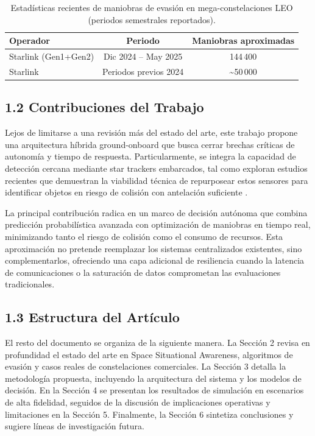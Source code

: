 \begin{table}[t]
\centering
\caption{Estadísticas recientes de maniobras de evasión en mega-constelaciones LEO (periodos semestrales reportados).}
\label{tab:maniobras_evasion}
\begin{tabular}{lcc}
\toprule
Operador & Periodo & Maniobras aproximadas \\
\midrule
Starlink (Gen1+Gen2) & Dic 2024 -- May 2025 & 144\,400 \\
Starlink & Periodos previos 2024 & \textasciitilde50\,000 \\
\bottomrule
\end{tabular}
\end{table}

\subsection{1.2 Contribuciones del Trabajo}

Lejos de limitarse a una revisión más del estado del arte, este trabajo propone una arquitectura híbrida ground-onboard que busca cerrar brechas críticas de autonomía y tiempo de respuesta. Particularmente, se integra la capacidad de detección cercana mediante star trackers embarcados, tal como exploran estudios recientes que demuestran la viabilidad técnica de repurposear estos sensores para identificar objetos en riesgo de colisión con antelación suficiente \cite{campiti2025detectability}.

La principal contribución radica en un marco de decisión autónoma que combina predicción probabilística avanzada con optimización de maniobras en tiempo real, minimizando tanto el riesgo de colisión como el consumo de recursos. Esta aproximación no pretende reemplazar los sistemas centralizados existentes, sino complementarlos, ofreciendo una capa adicional de resiliencia cuando la latencia de comunicaciones o la saturación de datos comprometan las evaluaciones tradicionales.

\subsection{1.3 Estructura del Artículo}

El resto del documento se organiza de la siguiente manera. La Sección 2 revisa en profundidad el estado del arte en Space Situational Awareness, algoritmos de evasión y casos reales de constelaciones comerciales. La Sección 3 detalla la metodología propuesta, incluyendo la arquitectura del sistema y los modelos de decisión. En la Sección 4 se presentan los resultados de simulación en escenarios de alta fidelidad, seguidos de la discusión de implicaciones operativas y limitaciones en la Sección 5. Finalmente, la Sección 6 sintetiza conclusiones y sugiere líneas de investigación futura.